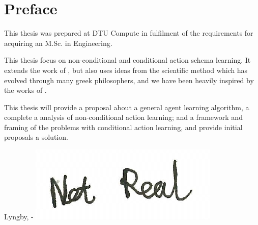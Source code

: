 \chapter{Preface}

This thesis was prepared at DTU Compute in fulfilment of the requirements for acquiring an M.Sc. in Engineering.

This thesis focus on non-conditional and conditional action schema learning.
It extends the work of \cite{Walsh2008}, but also uses ideas from the scientific method which has evolved through many greek philosophers, and we have been heavily inspired by the works of \cite{popper1959a}.

This thesis will provide a proposal about a general agent learning algorithm, a complete a analysis of non-conditional action learning; and a framework and framing of the problems with conditional action learning, and provide initial proposals a solution.
\vspace{20mm}
\begin{center}
    \hspace{20mm} Lyngby, \thesishandin-\thesisyear
    \vspace{5mm}
    \newline
    \includegraphics[scale=0.5]{figures/SignatureDummy}
\end{center}
\begin{flushright}
    \thesisauthor
\end{flushright}
